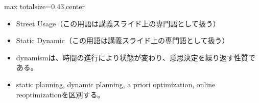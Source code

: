 \clearpage
{}
\begin{minipage}[t]{0.405\textwidth}
\begin{adjustbox}{max totalsize={\textwidth}{0.43\textheight},center}
\begin{minipage}{\textwidth}\scriptsize
{}\begin{itemize}
\item Street Usage（この用語は講義スライド上の専門語として扱う）
\item Static Dynamic（この用語は講義スライド上の専門語として扱う）
\end{itemize}\begin{itemize}
\item dynamismは、時間の進行により状態が変わり、意思決定を繰り返す性質である。
\item static planning, dynamic planning, a priori optimization, online reoptimizationを区別する。
\end{itemize}
\end{minipage}
\end{adjustbox}
\end{minipage}\hfill
